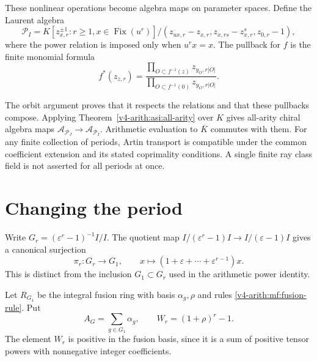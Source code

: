 These nonlinear operations become algebra maps on parameter spaces.
Define the Laurent algebra
\[
 \mathcal P_I=K[z_{x,r}^{\pm1}:r\ge1, x\in\operatorname{Fix}(u^r)]
 \big/(z_{ux,r}-z_{x,r}, z_{x,rs}-z_{x,r}^s, z_{0,r}-1),
\]
where the power relation is imposed only when $u^rx=x$.
The pullback for $f$ is the finite monomial formula
\begin{equation}\label{v4-arith:at:norm-algebra}
 f^*(z_{z,r})=
 \frac{\prod_{O\subset f^{-1}(z)}z_{y_O,r|O|}}
      {\prod_{O\subset f^{-1}(0)}z_{y_O,r|O|}}.
\end{equation}

The orbit argument proves that it respects the relations and that these
pullbacks compose. Applying Theorem~\ref{v4-arith:asi:all-arity} over $K$ gives
all-arity chiral algebra maps
$\mathcal A_{\mathcal P_J}\to\mathcal A_{\mathcal P_I}$.
Arithmetic evaluation to $\overline K$ commutes with them.
For any finite collection of periods, Artin transport is compatible
under the common coefficient extension and its stated coprimality
conditions. A single finite ray class field is not asserted for all
periods at once.


\section{Changing the period}
\label{v4-arith:at:sec:period}

Write \(G_r=(\varepsilon^r-1)^{-1}I/I\).
The quotient map \(I/(\varepsilon^r-1)I\to I/(\varepsilon-1)I\)
gives a canonical surjection
\begin{equation}\label{v4-arith:at:eq:period-label}
 \pi_r:G_r\longrightarrow G_1,\qquad
 x\longmapsto(1+\varepsilon+\cdots+\varepsilon^{r-1})x.
\end{equation}
This is distinct from the inclusion \(G_1\subset G_r\) used in
the arithmetic power identity.

Let \(R_{G_1}\) be the integral fusion ring with basis
\(\alpha_g,\rho\) and rules \eqref{v4-arith:mf:fusion-rule}.
Put
\[
 A_G=\sum_{g\in G_1}\alpha_g,\qquad W_r=(1+\rho)^r-1.
\]
The element \(W_r\) is positive in the fusion basis, since it is
a sum of positive tensor powers with nonnegative integer coefficients.

